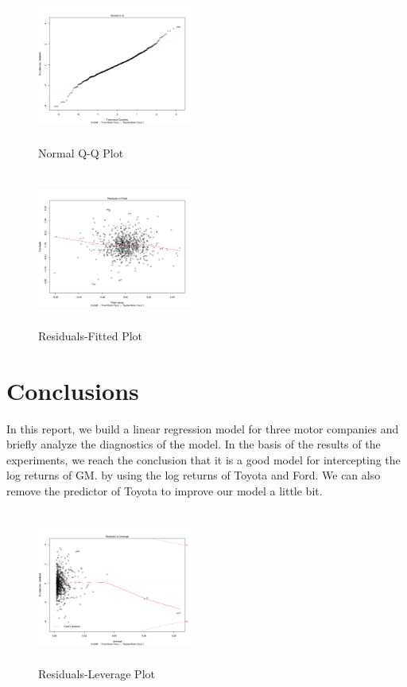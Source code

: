 \begin{figure}[h!]
\includegraphics[height=2in, width=2in]{qqplot}
\caption{Normal Q-Q Plot}
\label{img:qqplot}
\end{figure}

\begin{figure}[h!]
\includegraphics[height=2in, width=2in]{residuals-fitted}
\caption{Residuals-Fitted Plot}
\label{img:rfplot}
\end{figure}

\section{Conclusions}
In this report, we build a linear regression model for three motor companies and briefly analyze the diagnostics of the model. In the basis of the results of the experiments, we reach the conclusion that it is a good model for intercepting the log returns of GM. by using the log returns of Toyota and Ford. We can also remove the predictor of Toyota to improve our model a little bit. 

\begin{figure}[h!]
\includegraphics[height=2in, width=2in]{residuals-leverage}
\caption{Residuals-Leverage Plot}
\label{img:rlplot}
\end{figure}

